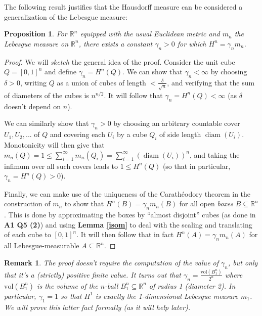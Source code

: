 \documentclass{article}[11pt]
\newcommand*{\R}{\mathbb{R}}
\newcommand*{\vol}{\textrm{vol}}
\DeclareMathOperator*{\diam}{diam}
\theoremstyle{dotless}
\newtheorem{prop}[thm]{Proposition}
\newtheorem{rem}[thm]{Remark}
\begin{document}
The following result justifies that the Hausdorff measure can be considered a generalization of the Lebesgue measure:

\begin{prop}\label{leb}
	For $\R^n$ equipped with the usual Euclidean metric and $m_n$ the Lebesgue measure on $\R^n$, there exists
	a constant $\gamma_n > 0$ for which $H^n = \gamma_n m_n$.
\end{prop}
\begin{proof}
	We will \textit{sketch} the general idea of the proof. Consider the unit cube $Q = [0,1]^n$ and define $\gamma_n = H^n(Q)$. 
	We can show that $\gamma_n < \infty$ by choosing $\delta > 0$, writing $Q$ as a union of cubes of length 
	$< \frac{\delta}{\sqrt{n}}$, and verifying that the sum of diameters of the cubes is $n^{n/2}$. It will follow that
	$\gamma_n = H^n(Q) < \infty$ (as $\delta$ doesn't depend on $n$). 
	\bigskip
	
	\noindent
	We can similarly show that $\gamma_n > 0$ by choosing an arbitrary countable cover $U_1, U_2, ...$ of $Q$ and covering
	each $U_i$ by a cube $Q_i$ of side length $\diam(U_i)$. Monotonicity will then give
	that $m_n(Q) = 1 \leqslant \sum_{i=1}^\infty m_n(Q_i) = \sum_{i=1}^\infty (\diam(U_i))^n$, and taking the infimum over all such
	covers leads to $1 \leqslant H^n(Q)$ (so that in particular, $\gamma_n = H^n(Q) > 0$).
	\bigskip
	
	\noindent
	Finally, we can make use of the uniqueness of the Carath\'{e}odory theorem
	in the construction of $m_n$ to show that $H^n(B) = \gamma_n m_n(B)$ for all open \textit{boxes} $B \subseteq \R^n$.
	This is done by approximating the boxes by ``almost disjoint'' cubes (as done in \textbf{A1 Q5 (2)}) and using \textbf{Lemma \ref{isom}} 
	to deal with the scaling and translating of each cube to $[0,1]^n$. It will then follow that in fact $H^n(A) = \gamma_n m_n(A)$
	for all Lebesgue-measurable $A \subseteq \R^n$.
\end{proof}

\begin{rem}\label{vol_rem}
	The proof doesn't require the computation of the value of $\gamma_n$, but only that it's a (strictly) positive finite value. It turns out that
	$\gamma_n = \frac{\vol(B_1^n)}{2^n}$ where $\vol(B_1^n)$ is the volume of the $n$-ball $B_1^n \subseteq \R^n$ of radius 1 
	(diameter 2). In particular, $\gamma_1 = 1$ so that $H^1$ is exactly the 1-dimensional Lebesgue measure $m_1$. We will prove this
	latter fact formally (as it will help later).
\end{rem}
\end{document}
